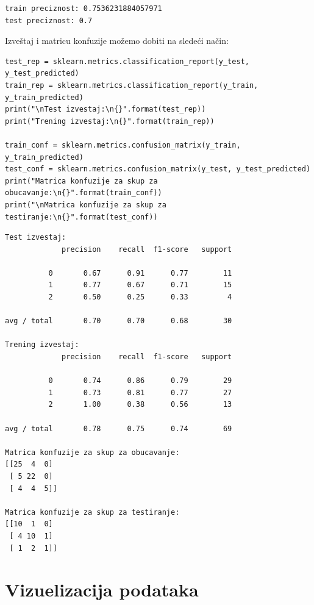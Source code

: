 \documentclass[12pt,a4paper]{article}
\begin{document}
\begin{verbatim}
train preciznost: 0.7536231884057971
test preciznost: 0.7
\end{verbatim}

Izve\v staj i matricu konfuzije mo\v zemo dobiti na slede\' ci na\v cin:

\begin{lstlisting}
test_rep = sklearn.metrics.classification_report(y_test, y_test_predicted)
train_rep = sklearn.metrics.classification_report(y_train, y_train_predicted)
print("\nTest izvestaj:\n{}".format(test_rep))
print("Trening izvestaj:\n{}".format(train_rep))

train_conf = sklearn.metrics.confusion_matrix(y_train, y_train_predicted)
test_conf = sklearn.metrics.confusion_matrix(y_test, y_test_predicted)
print("Matrica konfuzije za skup za obucavanje:\n{}".format(train_conf))
print("\nMatrica konfuzije za skup za testiranje:\n{}".format(test_conf))
\end{lstlisting}

\begin{verbatim}
Test izvestaj:
             precision    recall  f1-score   support

          0       0.67      0.91      0.77        11
          1       0.77      0.67      0.71        15
          2       0.50      0.25      0.33         4

avg / total       0.70      0.70      0.68        30

Trening izvestaj:
             precision    recall  f1-score   support

          0       0.74      0.86      0.79        29
          1       0.73      0.81      0.77        27
          2       1.00      0.38      0.56        13

avg / total       0.78      0.75      0.74        69

Matrica konfuzije za skup za obucavanje:
[[25  4  0]
 [ 5 22  0]
 [ 4  4  5]]

Matrica konfuzije za skup za testiranje:
[[10  1  0]
 [ 4 10  1]
 [ 1  2  1]]
\end{verbatim}

\section{Vizuelizacija podataka}
\end{document}
